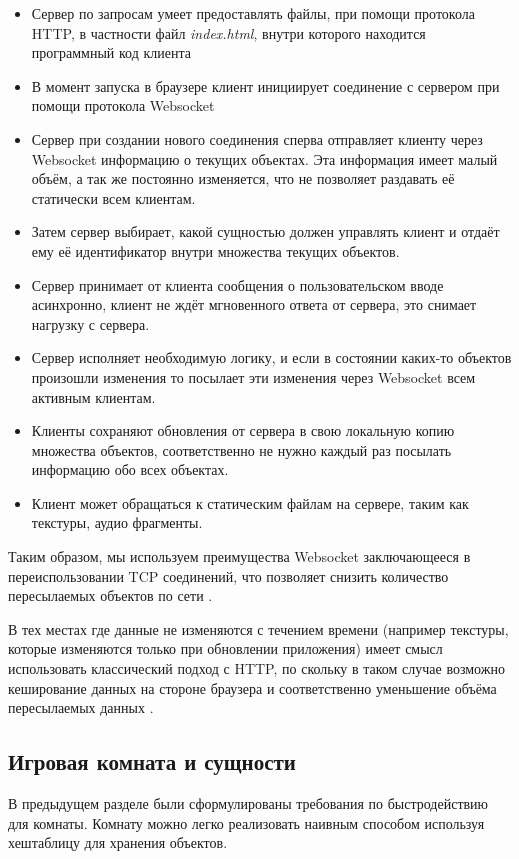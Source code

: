 \documentclass[a4paper,14pt, openany]{book}
\begin{document}
\begin{itemize}
   \item Сервер по запросам умеет предоставлять файлы, при помощи протокола HTTP, в частности файл \emph{index.html}, внутри которого находится программный код клиента
   \item В момент запуска в браузере клиент инициирует соединение с сервером при помощи протокола Websocket
   \item Сервер при создании нового соединения сперва отправляет клиенту через Websocket информацию о текущих объектах. Эта информация имеет малый объём, а так же постоянно изменяется, что не позволяет раздавать её статически всем клиентам.
    \item Затем сервер выбирает, какой сущностью должен управлять клиент  и отдаёт ему её идентификатор внутри множества текущих объектов.
    \item Сервер принимает от клиента сообщения о пользовательском вводе асинхронно, клиент не ждёт мгновенного ответа от сервера, это снимает нагрузку с сервера.
    \item Сервер исполняет необходимую логику, и если в состоянии каких-то объектов произошли изменения то посылает эти изменения через Websocket всем активным клиентам.
    \item Клиенты сохраняют обновления от сервера в свою локальную копию множества объектов, соответственно не нужно каждый раз посылать информацию обо всех объектах.
    \item Клиент может обращаться к статическим файлам на сервере, таким как текстуры, аудио фрагменты.
\end{itemize}

Таким образом, мы используем преимущества Websocket заключающееся в переиспользовании TCP соединений, что позволяет снизить количество пересылаемых объектов по сети \cite{websocketbook}. 

В тех местах где данные не изменяются с течением времени (например текстуры, которые изменяются только при обновлении приложения) имеет смысл использовать классический подход с HTTP, по скольку в таком случае возможно кеширование данных на стороне браузера и соответственно уменьшение объёма пересылаемых данных \cite{websocketvshttp}.


\subsection{Игровая комната и сущности}

В предыдущем разделе были сформулированы требования по быстродействию для комнаты. Комнату можно легко реализовать наивным способом используя хештаблицу для хранения объектов. 
\end{document}
